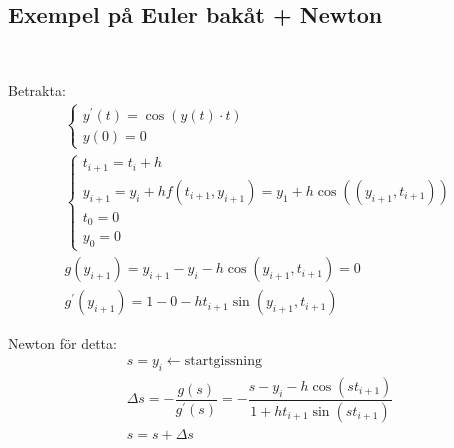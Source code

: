 \subsection{Exempel på Euler bakåt + Newton}\hfill\\
\par\bigskip
\noindent Betrakta:
\begin{equation*}
  \begin{gathered}
    \begin{cases*}
      y^{\prime}(t)=\cos(y(t)\cdot t)\\
      y(0)=0
    \end{cases*}\\
    \begin{cases*}
      t_{i+1}=t_i+h\\
      y_{i+1}=y_i+hf(t_{i+1}, y_{i+1})=y_1+h\cos((y_{i+1}, t_{i+1}))\\
      t_0=0\\
      y_0=0
    \end{cases*}\\
    g(y_{i+1})=y_{i+1}-y_i-h\cos(y_{i+1},t_{i+1})=0\\
    g^{\prime}(y_{i+1})=1-0-ht_{i+1}\sin(y_{i+1},t_{i+1})
  \end{gathered}
\end{equation*}
\par\bigskip
\noindent Newton för detta:
\begin{equation*}
  \begin{gathered}
    s = y_{i} \leftarrow\text{startgissning}\\
    \Delta s = -\dfrac{g(s)}{g^{\prime}(s)} = -\dfrac{s-y_i-h\cos(st_{i+1})}{1+ht_{i+1}\sin(st_{i+1})}\\
    s = s+\Delta s
  \end{gathered}
\end{equation*}
\par\bigskip
